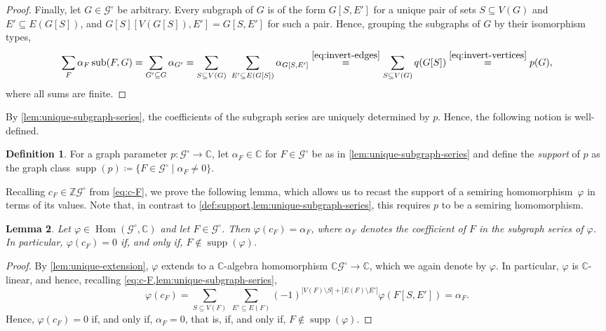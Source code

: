\documentclass[11pt]{scrartcl}
\theoremstyle{definition}
\newtheorem{definition}{Definition}[section]
\theoremstyle{plain}
\newtheorem{lemma}[definition]{Lemma}
\theoremstyle{remark}
\renewcommand\phi\varphi
\DeclareMathOperator\Hom{Hom}
\DeclareMathOperator{\supp}{supp}
\DeclareMathOperator{\sub}{sub}
\newcommand{\lG}{\mathcal{G}^\circ}
\newcommand{\C}{\mathbb{C}}
\begin{document}
\begin{proof}
		Finally, let $G \in \lG$ be arbitrary.
		Every subgraph of $G$ is of the form $G[S, E']$
		for a unique pair of sets $S \subseteq V(G)$ and $E' \subseteq E(G[S])$,
		and $G[S][V(G[S]), E'] = G[S, E']$ for such a pair.
		Hence, grouping the subgraphs of $G$ by their isomorphism types,
		\[
			\sum_F \alpha_F \sub(F, G)
			= \sum_{G' \subseteq G} \alpha_{G'}
			= \sum_{S \subseteq V(G)} \ \sum_{E' \subseteq E(G[S])} \alpha_{G[S, E']}
			\overset{\eqref{eq:invert-edges}}{=} \sum_{S \subseteq V(G)} q(G[S])
			\overset{\eqref{eq:invert-vertices}}{=} p(G),
		\]
		where all sums are finite.
	\end{proof}

	







	By \cref{lem:unique-subgraph-series}, the coefficients of the subgraph series are uniquely determined by $p$.
	Hence, the following notion is well-defined.
	\begin{definition}\label{def:support}
		For a graph parameter $p \colon \lG \to \mathbb{C}$, let $\alpha_F \in \C$ for $F \in \lG$ be as in  \cref{lem:unique-subgraph-series} and define the \emph{support} of $p$ as the graph class
		\(
		\supp(p) \coloneqq \{F \in \lG \mid \alpha_F \neq 0 \}.
	\)
	\end{definition}
	
	Recalling $c_F \in \mathbb{Z}\lG$ from \cref{eq:c-F}, we prove the following lemma, which allows us to recast the support of a semiring homomorphism~$\phi$ in terms of its values.
    Note that, in contrast to \cref{def:support,lem:unique-subgraph-series},
    this requires $p$ to be a semiring homomorphism.

	\begin{lemma}\label{lem:c-F-support}
		Let $\phi \in \Hom(\lG, \mathbb{C})$ and let $F \in \lG$.
		Then $\phi(c_F) = \alpha_F$,
		where $\alpha_F$ denotes the coefficient of $F$ in the subgraph series of $\phi$.
		In particular, $\phi(c_F) = 0$ if, and only if, $F \notin \supp(\phi)$.
	\end{lemma}
	\begin{proof}
		By \cref{lem:unique-extension},
		$\phi$ extends to a $\mathbb{C}$-algebra homomorphism $\mathbb{C}\lG \to \mathbb{C}$,
		which we again denote by $\phi$.
		In particular, $\phi$ is $\mathbb{C}$-linear, and hence, recalling  \cref{eq:c-F,lem:unique-subgraph-series},
		\[
			\phi(c_F)
			= \sum_{S \subseteq V(F)} \ \sum_{E' \subseteq E(F)} (-1)^{|V(F) \setminus S| + |E(F) \setminus E'|} \phi(F[S, E'])
			= \alpha_F.
		\]
		Hence, $\phi(c_F) = 0$ if, and only if, $\alpha_F = 0$,
		that is, if, and only if, $F \notin \supp(\phi)$.
	\end{proof}
\end{document}
